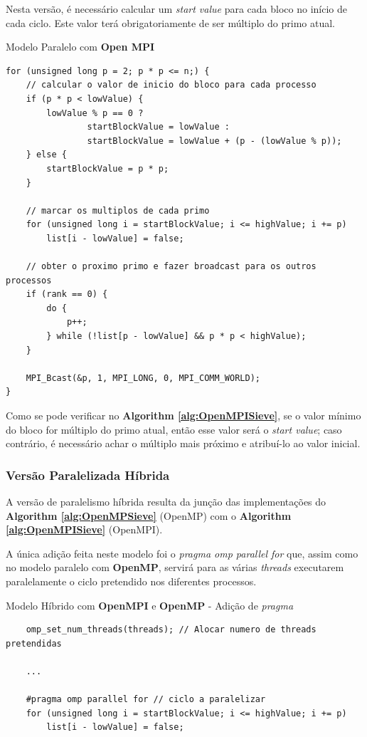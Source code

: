 \documentclass[a4paper]{article}
\begin{document}
Nesta versão, é necessário calcular um \textit{start value} para cada bloco no início de cada ciclo. Este valor terá obrigatoriamente de ser múltiplo do primo atual.

\begin{algorithm}
\caption{Modelo Paralelo com \textbf{Open MPI}}
\label{alg:OpenMPISieve}
\begin{lstlisting}
for (unsigned long p = 2; p * p <= n;) {
	// calcular o valor de inicio do bloco para cada processo
	if (p * p < lowValue) {
		lowValue % p == 0 ?
				startBlockValue = lowValue :
				startBlockValue = lowValue + (p - (lowValue % p));
	} else {
		startBlockValue = p * p;
	}

	// marcar os multiplos de cada primo
	for (unsigned long i = startBlockValue; i <= highValue; i += p)
		list[i - lowValue] = false;

	// obter o proximo primo e fazer broadcast para os outros processos
	if (rank == 0) {
		do {
			p++;
		} while (!list[p - lowValue] && p * p < highValue);
	}

	MPI_Bcast(&p, 1, MPI_LONG, 0, MPI_COMM_WORLD);
}
\end{lstlisting}
\end{algorithm}

Como se pode verificar no \textbf{Algorithm \ref{alg:OpenMPISieve}}, se o valor mínimo do bloco for múltiplo do primo atual, então esse valor será o \textit{start value}; caso contrário, é necessário achar o múltiplo mais próximo e atribuí-lo ao valor inicial.

\subsubsection{Versão Paralelizada Híbrida}

A versão de paralelismo híbrida resulta da junção das implementações do \textbf{Algorithm \ref{alg:OpenMPSieve}} (OpenMP) com o \textbf{Algorithm \ref{alg:OpenMPISieve}} (OpenMPI).

A única adição feita neste modelo foi o \textit{pragma omp parallel for} que, assim como no modelo paralelo com \textbf{OpenMP}, servirá para as várias \textit{threads} executarem paralelamente o ciclo pretendido nos diferentes processos.

\begin{algorithm}
\caption{Modelo Híbrido com \textbf{OpenMPI} e \textbf{OpenMP} - Adição de \textit{pragma}}
\label{alg:OpenMPIOpenMPSieve}
\begin{lstlisting}
    omp_set_num_threads(threads); // Alocar numero de threads pretendidas
    
    ...

    #pragma omp parallel for // ciclo a paralelizar
	for (unsigned long i = startBlockValue; i <= highValue; i += p)
		list[i - lowValue] = false;
\end{lstlisting}
\end{algorithm}
\end{document}
